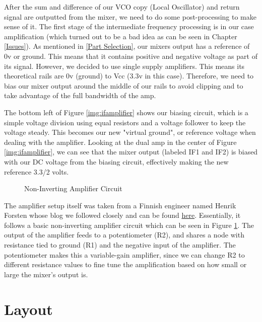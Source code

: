 After the sum and difference of our VCO copy (Local Oscillator) and return signal
are outputted from the mixer, we need to do some post-processing to make sense of it.
The first stage of the intermediate frequency processing is in our case
amplification (which turned out to be a bad idea as can be seen in Chapter \ref{Issues}).
As mentioned in \ref{Part Selection}, our mixers output has a reference of 0v or ground.
This means that it contains positive and negative voltage as part of its signal. However,
we decided to use single supply amplifiers. This means its theoretical rails are 0v (ground)
to Vcc (3.3v in this case). Therefore, we need to bias our mixer output around the middle of our rails
to avoid clipping and to take advantage of the full bandwidth of the amp.

The bottom left of Figure \ref{img:ifamplifier} shows our biasing circuit,
which is a simple voltage division using equal resistors and a voltage follower
to keep the voltage steady. This becomes our new "virtual ground", or reference voltage
when dealing with the amplifier. Looking at the dual amp in the center of Figure \ref{img:ifamplifier}, we can see that the mixer output (labeled IF1 and IF2) is
biased with our DC voltage from the biasing circuit, effectively making the new reference 3.3/2 volts. 

\begin{figure}[H]
  \centering
\caption{Non-Inverting Amplifier Circuit}
\label{img:noninverting}
\end{figure}

The amplifier setup itself was taken from a Finnish engineer named Henrik Forsten whose blog we followed closely and can be found
\href{https://hforsten.com/6-ghz-frequency-modulated-radar.html}{here}. Essentially, it follows a basic non-inverting amplifier
circuit which can be seen in Figure \ref{img:noninverting}. The output of the amplifier feeds to a potentiometer (R2), 
and shares a node with resistance tied to ground (R1) and the negative input of the amplifier. The potentiometer makes this
a variable-gain amplifier, since we can change R2 to different resistance values to fine tune the amplification based on how
small or large the mixer's output is.

\section{Layout}
\